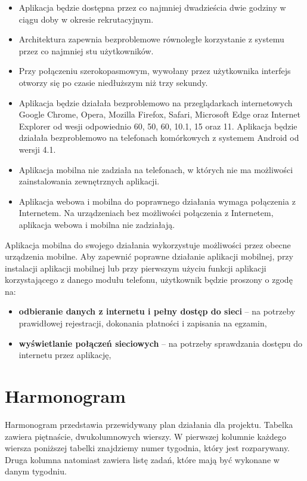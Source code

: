 \documentclass{article}
\begin{document}
\begin{itemize}
	\item Aplikacja będzie dostępna przez co najmniej dwadzieścia dwie godziny w ciągu doby w okresie rekrutacyjnym.
	\item Architektura zapewnia bezproblemowe równoległe korzystanie z systemu przez co najmniej stu użytkowników.
	\item Przy połączeniu szerokopasmowym, wywołany przez użytkownika interfejs otworzy się po czasie niedłuższym niż trzy sekundy. 
	\item Aplikacja będzie działała bezproblemowo na przeglądarkach internetowych Google Chrome, Opera, Mozilla Firefox, Safari, Microsoft Edge oraz Internet Explorer od wesji odpowiednio 60, 50, 60, 10.1, 15 oraz 11. Aplikacja będzie działała bezproblemowo na telefonach komórkowych z systemem Android od wersji 4.1.
	\item Aplikacja mobilna nie zadziała na telefonach, w których nie ma możliwości zainstalowania zewnętrznych aplikacji.
	\item Aplikacja webowa i mobilna do poprawnego działania wymaga połączenia z Internetem. Na urządzeniach bez możliwości połączenia z Internetem, aplikacja webowa i mobilna nie zadziałają.
\end{itemize}

Aplikacja mobilna do swojego działania wykorzystuje możliwości przez obecne urządzenia mobilne. Aby zapewnić poprawne działanie aplikacji mobilnej, przy instalacji aplikacji mobilnej lub przy pierwszym użyciu funkcji aplikacji korzystającego z danego modułu telefonu, użytkownik będzie proszony o zgodę na:
\begin{itemize}
	\item \textbf{odbieranie danych z internetu i pełny dostęp do sieci} – na potrzeby prawidłowej rejestracji, dokonania płatności i zapisania na egzamin,
	\item \textbf{wyświetlanie połączeń sieciowych} – na potrzeby sprawdzania dostępu do internetu przez aplikację,
\end{itemize}

\section{Harmonogram}

Harmonogram przedstawia przewidywany plan działania dla projektu. Tabelka zawiera piętnaście, dwukolumnowych wierszy. W pierwszej kolumnie każdego wiersza poniższej tabelki znajdziemy numer tygodnia, który jest rozparywany. Druga kolumna natomiast zawiera listę zadań, które mają być wykonane w danym tygodniu.
\end{document}
